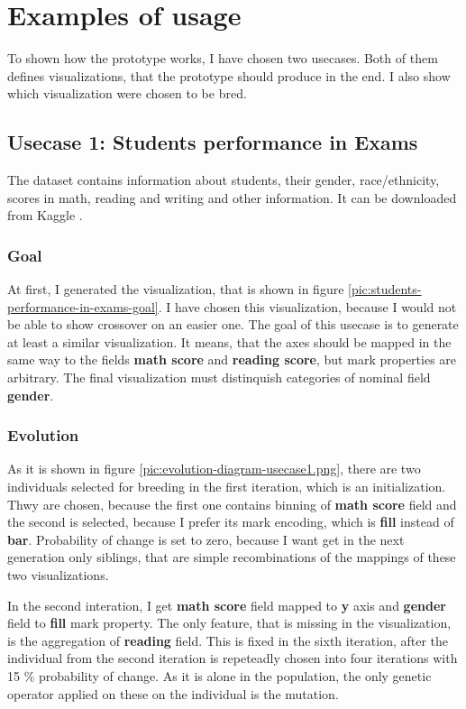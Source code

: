 \chapter{Examples of usage}
To shown how the prototype works, I have chosen two usecases. Both of them defines visualizations, that the prototype should produce in the end. I also show which visualization were chosen to be bred.
\section{Usecase 1: Students performance in Exams}
The dataset contains information about students, their gender, race/ethnicity, scores in math, reading and writing and other information. It can be downloaded from Kaggle \cite{students-performance-in-exams}.

\subsection{Goal}
At first, I generated the visualization, that is shown in figure \ref{pic:students-performance-in-exams-goal}. I have chosen this visualization, because I would not be able to show crossover on an easier one. The goal of this usecase is to generate at least a similar visualization. It means, that the axes should be mapped in the same way to the fields \textbf{math score} and \textbf{reading score}, but mark properties are arbitrary. The final visualization must distinquish categories of nominal field \textbf{gender}.


\subsection{Evolution}

As it is shown in figure \ref{pic:evolution-diagram-usecase1.png}, there are two individuals selected for breeding in the first iteration, which is an initialization. Thwy are chosen, because the first one contains binning of \textbf{math score} field and the second is selected, because I prefer its mark encoding, which is \textbf{fill} instead of \textbf{bar}.
Probability of change is set to zero, because I want get in the next generation only siblings, that are simple recombinations of the mappings of these two visualizations.

In the second interation, I get \textbf{math score} field mapped to \textbf{y} axis and \textbf{gender} field to \textbf{fill} mark property. The only feature, that is missing in the visualization, is the aggregation of \textbf{reading} field. This is fixed in the sixth iteration, after the individual from the second iteration is repeteadly chosen into four iterations with 15 \% probability of change. As it is alone in the population, the only genetic operator applied on these on the individual is the mutation.

